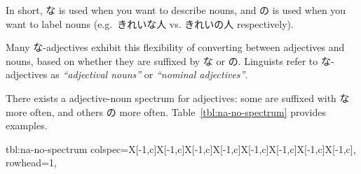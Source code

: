 \documentclass[../nihongo-gakushuu-kyouzai.tex]{subfiles}
\begin{document}
In short, な is used when you want to describe nouns, and の is used when you want to label nouns (e.g.\ きれいな人 vs. きれいの人 respectively).

Many な-adjectives exhibit this flexibility of converting between adjectives and nouns, based on whether they are suffixed by な or の. Linguists refer to な-adjectives as \emph{``adjectival nouns''} or \emph{``nominal adjectives''}.

There exists a adjective-noun spectrum for adjectives: some are suffixed with な more often, and others の more often. Table~\ref{tbl:na-no-spectrum} provides examples.

{tbl:na-no-spectrum}  %
{
    colspec={X[-1,c]X[-1,c]X[-1,c]X[-1,c]X[-1,c]X[-1,c]X[-1,c]X[-1,c]},
    rowhead=1,
}  %
\end{document}
